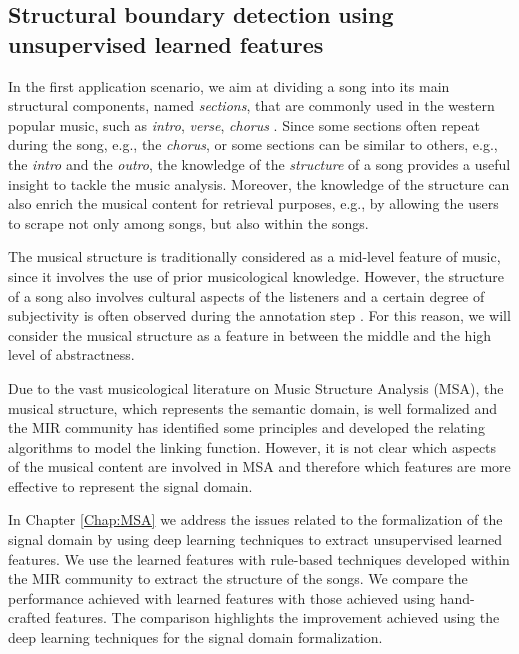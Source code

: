 \subsection{Structural boundary detection using unsupervised learned features}
In the first application scenario, we aim at dividing a song into its main structural components, named \textit{sections}, that are commonly used in the western popular music, such as \textit{intro}, \textit{verse}, \textit{chorus} \cite{muller2007towards,muller2015fundamentals}. Since some sections often repeat during the song, e.g., the \textit{chorus}, or some sections can be similar to others, e.g., the \textit{intro} and the \textit{outro}, the knowledge of the \textit{structure} of a song provides a useful insight to tackle the music analysis. Moreover, the knowledge of the structure can also enrich the musical content for retrieval purposes, e.g., by allowing the users to scrape not only among songs, but also within the songs.

The musical structure is traditionally considered as a mid-level feature of music, since it involves the use of prior musicological knowledge. However, the structure of a song also involves cultural aspects of the listeners and a certain degree of subjectivity is often observed during the annotation step \cite{ullrich2014boundary}. For this reason, we will consider the musical structure as a feature in between the middle and the high level of abstractness. 

Due to the vast musicological literature on Music Structure Analysis (MSA), the musical structure, which represents the semantic domain, is well formalized and the MIR community has identified some principles and developed the relating algorithms to model the linking function. However, it is not clear which aspects of the musical content are involved in MSA and therefore which features are more effective to represent the signal domain.

In Chapter \ref{Chap:MSA} we address the issues related to the formalization of the signal domain by using deep learning techniques to extract unsupervised learned features. We use the learned features with rule-based techniques developed within the MIR community to extract the structure of the songs. We compare the performance achieved with learned features with those achieved using hand-crafted features. The comparison highlights the improvement achieved using the deep learning techniques for the signal domain formalization.

